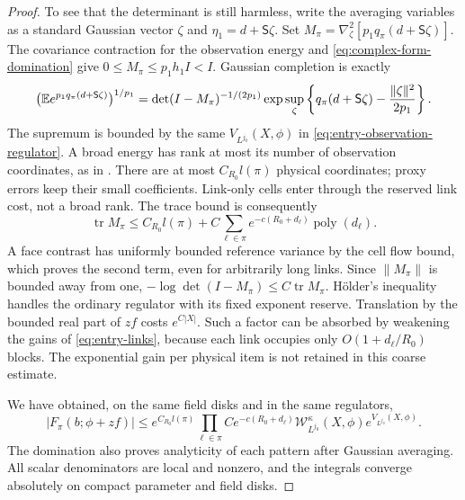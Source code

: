 \begin{proof}
To see that the determinant is still harmless, write the averaging
variables as a standard Gaussian vector $\zeta$ and
$\eta_1=d+\mathsf S\zeta$.  Set
$M_\pi=\nabla_\zeta^2[p_1q_\pi(d+\mathsf S\zeta)]$.
The covariance contraction for the observation energy and
\eqref{eq:complex-form-domination} give
$0\le M_\pi\le p_1h_1I<I$.  Gaussian completion is exactly
\begin{equation}\label{eq:complex-entry-completion}
 \bigl(\mathbb E e^{p_1q_\pi(d+\mathsf S\zeta)}\bigr)^{1/p_1}
 =\det(I-M_\pi)^{-1/(2p_1)}
  \exp\sup_\zeta\left\{q_\pi(d+\mathsf S\zeta)
                                  -\frac{\|\zeta\|^2}{2p_1}\right\}.
\end{equation}
The supremum is bounded by the same $V_{L^{j_0}}(X,\phi)$ in
\eqref{eq:entry-observation-regulator}.  A broad energy has rank at most
its number of observation coordinates, as in
\cite[Equations~(83)--(84)]{F}.  There are at most
$C_{R_0}l(\pi)$ physical coordinates; proxy errors keep their small
coefficients.  Link-only cells enter through the reserved link cost,
not a broad rank.  The trace bound is consequently
\begin{equation}\label{eq:complex-entry-trace}
 \operatorname{tr}M_\pi\le C_{R_0}l(\pi)
       +C\sum_{\ell\in\pi}e^{-c(R_0+d_\ell)}
                                      \operatorname{poly}(d_\ell).
\end{equation}
A face contrast has uniformly bounded reference variance by the cell
flow bound, which proves the second term, even for arbitrarily long
links.  Since $\|M_\pi\|$ is bounded away from one,
$-\log\det(I-M_\pi)\le C\operatorname{tr}M_\pi$.
H\"older's inequality handles the ordinary regulator with its fixed
exponent reserve.  Translation by the bounded real part of $zf$ costs
$e^{C|X|}$.  Such a factor can be absorbed by weakening the gains of
\eqref{eq:entry-links}, because each link occupies only
$O(1+d_\ell/R_0)$ blocks.  The exponential gain per physical item is
not retained in this coarse estimate.

We have obtained, on the same field disks and in the same regulators,
\begin{equation}\label{eq:entry-complex-pattern}
 |F_\pi(b;\phi+zf)|
 \le e^{C_{R_0}l(\pi)}
       \prod_{\ell\in\pi}Ce^{-c(R_0+d_\ell)}
       \mathscr W_{L^{j_0}}^\kappa(X,\phi)e^{V_{L^{j_0}}(X,\phi)}.
\end{equation}
The domination also proves analyticity of each pattern after Gaussian
averaging.  All scalar denominators are local and nonzero, and the
integrals converge absolutely on compact parameter and field disks.


\end{proof}
